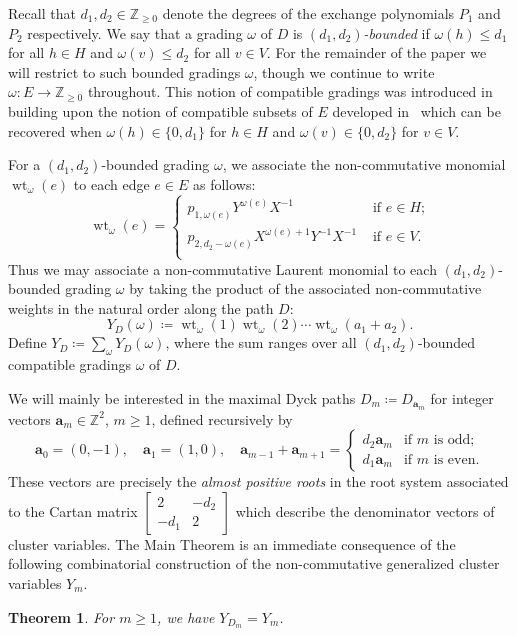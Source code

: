 \documentclass[10pt]{amsart}
\newtheorem{theorem}{Theorem}[section]
\theoremstyle{definition}
\newcommand{\bfa}{\mathbf{a}}
\newcommand{\ZZ}{\mathbb{Z}}
\DeclareMathOperator{\wt}{wt}
\begin{document}
 Recall that $d_1,d_2\in\ZZ_{\ge0}$ denote the degrees of the exchange polynomials $P_1$ and $P_2$ respectively. 
 We say that a grading $\omega$ of $D$ is \emph{$(d_1,d_2)$-bounded} if $\omega(h)\le d_1$ for all $h\in H$ and $\omega(v)\le d_2$ for all $v\in V$. 
 For the remainder of the paper we will restrict to such bounded gradings $\omega$, though we continue to write $\omega:E\to\ZZ_{\ge0}$ throughout.
 This notion of compatible gradings was introduced in~\cite{rupel2} building upon the notion of compatible subsets of $E$ developed in~\cite{lee-li-zelevinsky} which can be recovered when $\omega(h)\in\{0,d_1\}$ for $h\in H$ and $\omega(v)\in\{0,d_2\}$ for $v\in V$.

 For a $(d_1,d_2)$-bounded grading $\omega$, we associate the non-commutative monomial $\wt_\omega(e)$ to each edge $e\in E$ as follows:
 \begin{equation}
 \label{eq:edge weights}
 \wt_\omega(e)=\begin{cases}
 p_{1,\omega(e)}Y^{\omega(e)}X^{-1} & \text{ if $e\in H$;}\\
 p_{2,d_2-\omega(e)}X^{\omega(e)+1}Y^{-1}X^{-1} & \text{ if $e\in V$.}\\
 \end{cases}
 \end{equation}
 Thus we may associate a non-commutative Laurent monomial to each $(d_1,d_2)$-bounded grading $\omega$ by taking the product of the associated non-commutative weights in the natural order along the path $D$:
 \begin{equation}
 \label{eq:total path weights}
 Y_D(\omega)\coloneqq \wt_\omega(1)\wt_\omega(2)\cdots\wt_\omega(a_1+a_2).
 \end{equation} 
 Define $Y_D\coloneqq \sum\limits_\omega Y_D(\omega)$, where the sum ranges over all $(d_1,d_2)$-bounded compatible gradings $\omega$ of $D$.

 We will mainly be interested in the maximal Dyck paths $D_m\coloneqq D_{\bfa_m}$ for integer vectors $\bfa_m\in\ZZ^2$, $m\ge1$, defined recursively by
 \begin{equation}
 \label{eq:roots recursive}
 \bfa_0=(0,-1),\quad
 \bfa_1=(1,0),\quad
 \bfa_{m-1}+\bfa_{m+1}=\begin{cases}d_2\bfa_m & \text{if $m$ is odd;}\\ d_1\bfa_m & \text{if $m$ is even.}\end{cases}
 \end{equation}
 These vectors are precisely the \emph{almost positive roots} in the root system associated to the Cartan matrix $\left[\begin{array}{cc} 2 & -d_2\\ -d_1 & 2\end{array}\right]$ which describe the denominator vectors of cluster variables.
 The Main Theorem is an immediate consequence of the following combinatorial construction of the non-commutative generalized cluster variables $Y_m$.
 \begin{theorem}
 \label{th:combinatorial construction}
 For $m\ge1$, we have $Y_{D_m}=Y_m$.
 \end{theorem}
\end{document}
